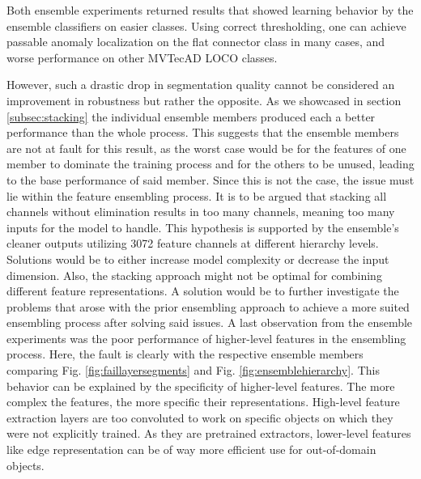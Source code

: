 Both ensemble experiments returned results that showed learning behavior by the ensemble classifiers on easier classes. Using correct thresholding, one can achieve passable 
anomaly localization on the flat connector class in many cases, and worse performance on other MVTecAD LOCO \cite{LOCODentsAndScratchesBergmann2022} classes.

However, such a drastic drop in segmentation quality cannot be considered an improvement in robustness but rather the opposite. As we showcased in 
section \ref{subsec:stacking} the individual ensemble members produced each a better performance than the whole process. 
This suggests that the ensemble members are not at fault for this result, as the worst case would be for the features of one member to dominate the training process 
and for the others to be unused, leading to the base performance of said member. Since this is not the case, the issue must lie within the feature ensembling process. 
It is to be argued that stacking all channels without elimination results in too many channels, meaning too many inputs for the model to handle. This hypothesis is 
supported by the ensemble's cleaner outputs utilizing 3072 feature channels at different hierarchy levels. Solutions would be to either 
increase model complexity or decrease the input dimension. Also, the stacking approach might not be optimal for combining different feature representations. 
A solution would be to further investigate the problems that arose with the prior ensembling approach to achieve a more suited ensembling process after solving said 
issues. \newline 
A last observation from the ensemble experiments was the poor performance of higher-level features in the ensembling process. 
Here, the fault is clearly with the respective ensemble members comparing Fig. \ref{fig:faillayersegments} and Fig. \ref{fig:ensemblehierarchy}. This behavior can be explained 
by the specificity of higher-level features. The more complex the features, the more specific their representations. High-level feature extraction layers are too 
convoluted to work on specific objects on which they were not explicitly trained. As they are pretrained extractors, lower-level features like edge representation can be of way 
more efficient use for out-of-domain objects. \newline 





